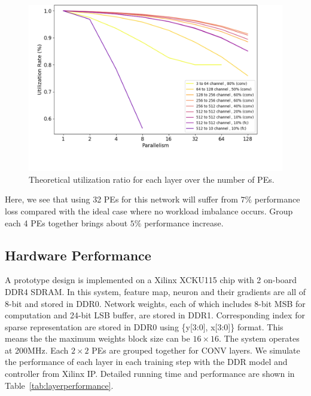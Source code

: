

\begin{figure}[tb]
  \centering
  \includegraphics[width=1.0\columnwidth]{figures/util_real.png}
  \caption{Theoretical utilization ratio for each layer over the number of PEs.}
  \label{fig:util_real}
\end{figure}

Here, we see that using 32 PEs for this network will suffer from $7\%$ performance loss compared with the ideal case where no workload imbalance occurs. Group each 4 PEs together brings about $5\%$ performance increase. 


\subsection{Hardware Performance}
A prototype design is implemented on a Xilinx XCKU115 chip with 2 on-board DDR4 SDRAM. In this system, feature map, neuron and their gradients are all of 8-bit and stored in DDR0. Network weights, each of which includes 8-bit MSB for computation and 24-bit LSB buffer, are stored in DDR1. Corresponding index for sparse representation are stored in DDR0 using \{y[3:0], x[3:0]\} format. This means the the maximum weights block size can be $16\times 16$. The system operates at 200MHz. Each $2\times 2$ PEs are grouped together for CONV layers. We simulate the performance of each layer in each training step with the DDR model and controller from Xilinx IP. Detailed running time and performance are shown in Table~\ref{tab:layerperformance}.





